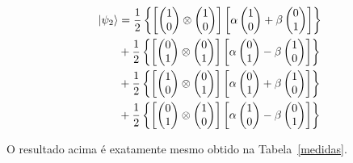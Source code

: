 \begin{align}
\ket{\psi_2} &=\frac{1}{2} \left\{ \left[\begin{pmatrix}
1 \\
0
\end{pmatrix} \otimes \begin{pmatrix}
1 \\
0
\end{pmatrix}\right] \left[\alpha \begin{pmatrix}
1 \\
0
\end{pmatrix} + \beta \begin{pmatrix}
0 \\
1
\end{pmatrix}\right]\right\} \nonumber \\
&+\frac{1}{2} \left\{ \left[\begin{pmatrix}
0 \\
1
\end{pmatrix} \otimes \begin{pmatrix}
0 \\
1
\end{pmatrix}\right] \left[\alpha \begin{pmatrix}
0 \\
1
\end{pmatrix} - \beta \begin{pmatrix}
1 \\
0
\end{pmatrix}\right]\right\} \nonumber \\
&+\frac{1}{2} \left\{\left[ \begin{pmatrix}
1 \\
0
\end{pmatrix} \otimes \begin{pmatrix}
0 \\
1
\end{pmatrix}\right] \left[\alpha \begin{pmatrix}
0 \\
1
\end{pmatrix} + \beta \begin{pmatrix}
1 \\
0
\end{pmatrix}\right]\right\} \nonumber \\
&+\frac{1}{2} \left\{ \left[ \begin{pmatrix}
0 \\
1
\end{pmatrix} \otimes \begin{pmatrix}
1 \\
0
\end{pmatrix}\right] \left[\alpha \begin{pmatrix}
1 \\
0
\end{pmatrix} - \beta \begin{pmatrix}
0 \\
1
\end{pmatrix}\right] \right\}
\end{align}

O resultado acima é exatamente mesmo obtido na Tabela~\ref{medidas}.

